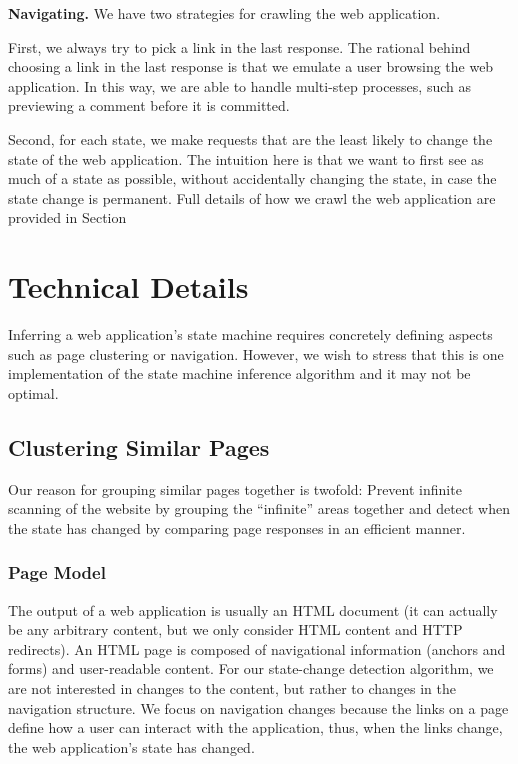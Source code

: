 \noindent \textbf{Navigating.}
We have two strategies for crawling the web application.

First, we always try to pick a link in the last response. The rational behind choosing a
link in the last response is that we emulate a user browsing the web application.
In this way, we are able to handle multi-step processes, such as previewing a
comment before it is committed.

Second, for each state, we make requests that are the least likely to change
the state of the web application. The intuition here is that we want to first see
as much of a state as possible, without accidentally changing the state, in
case the state change is permanent. Full details of how we crawl the web
application are provided in Section~

\section{Technical Details}

Inferring a web application's state machine requires concretely defining
aspects such as page clustering or navigation. However, we wish to stress that
this is one implementation of the state machine inference algorithm and it may
not be optimal.

\subsection{Clustering Similar Pages}

Our reason for grouping similar pages together is twofold: Prevent infinite
scanning of the website by grouping the ``infinite'' areas together and detect
when the state has changed by comparing page responses in an efficient manner.

\subsubsection{Page Model}



The output of a web application is usually an HTML document (it can actually be
any arbitrary content, but we only consider HTML content and HTTP redirects).
An HTML page is composed of navigational information (anchors and forms) and
user-readable content. For our state-change detection algorithm, we are not
interested in changes to the content, but rather to changes in the navigation
structure. We focus on navigation changes because the links on a page define
how a user can interact with the application, thus, when the links change, the
web application's state has changed.

